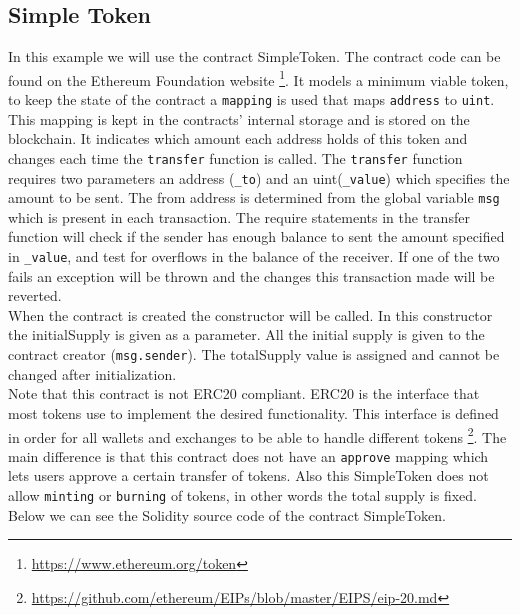 \documentclass[a4paper]{article}
\begin{document}
\subsection{Simple Token}
In this example we will use the contract SimpleToken. The contract code can be found on the Ethereum Foundation website \footnote{\url{https://www.ethereum.org/token}}. 
It models a minimum viable token, to keep the state of the contract a \texttt{mapping} is used that maps \texttt{address} to \texttt{uint}. This mapping is kept in the contracts' internal storage and is stored on the blockchain. It indicates which amount each address holds of this token and changes each time the \texttt{transfer} function is called. The \texttt{transfer} function requires two parameters an address (\texttt{\_to})  and an uint(\texttt{\_value}) which specifies the amount to be sent. The from address is determined from the global variable \texttt{msg} which is present in each transaction. The require statements in the transfer function will check if the sender has enough balance to sent the amount specified in \texttt{\_value}, and test for overflows in the balance of the receiver. If one of the two fails an exception will be thrown and the changes this transaction made will be reverted.\\
When the contract is created the constructor will be called. In this constructor the initialSupply is given as a parameter. All the initial supply is given to the contract creator (\texttt{msg.sender}). The totalSupply value is assigned and cannot be changed after initialization.\\
Note that this contract is not ERC20 compliant. ERC20 is the interface that most tokens use to implement the desired functionality. This interface is defined in order for all wallets and exchanges to be able to handle different tokens \footnote{\url{https://github.com/ethereum/EIPs/blob/master/EIPS/eip-20.md}}. The main difference is that this contract does not have an \texttt{approve} mapping which lets users approve a certain transfer of tokens. Also this SimpleToken does not allow \texttt{minting} or \texttt{burning} of tokens, in other words the total supply is fixed. Below we can see the Solidity source code of the contract SimpleToken.


\end{document}
